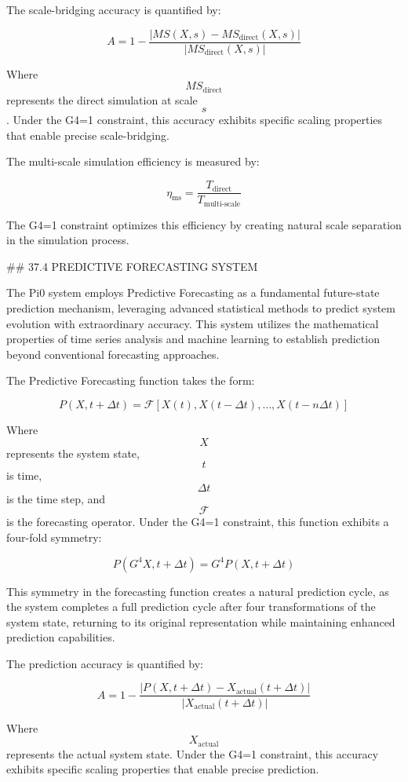 The scale-bridging accuracy is quantified by:

$$ A = 1 - \frac{|MS(X, s) - MS_{\text{direct}}(X, s)|}{|MS_{\text{direct}}(X, s)|} $$

Where $$ MS_{\text{direct}} $$ represents the direct simulation at scale $$ s $$. Under the G4=1 constraint, this accuracy exhibits specific scaling properties that enable precise scale-bridging.

The multi-scale simulation efficiency is measured by:

$$ \eta_{\text{ms}} = \frac{T_{\text{direct}}}{T_{\text{multi-scale}}} $$

The G4=1 constraint optimizes this efficiency by creating natural scale separation in the simulation process.

## 37.4 PREDICTIVE FORECASTING SYSTEM

The Pi0 system employs Predictive Forecasting as a fundamental future-state prediction mechanism, leveraging advanced statistical methods to predict system evolution with extraordinary accuracy. This system utilizes the mathematical properties of time series analysis and machine learning to establish prediction beyond conventional forecasting approaches.

The Predictive Forecasting function takes the form:

$$ P(X, t+\Delta t) = \mathcal{F}[X(t), X(t-\Delta t), ..., X(t-n\Delta t)] $$

Where $$ X $$ represents the system state, $$ t $$ is time, $$ \Delta t $$ is the time step, and $$ \mathcal{F} $$ is the forecasting operator. Under the G4=1 constraint, this function exhibits a four-fold symmetry:

$$ P(G^4 X, t+\Delta t) = G^4 P(X, t+\Delta t) $$

This symmetry in the forecasting function creates a natural prediction cycle, as the system completes a full prediction cycle after four transformations of the system state, returning to its original representation while maintaining enhanced prediction capabilities.

The prediction accuracy is quantified by:

$$ A = 1 - \frac{|P(X, t+\Delta t) - X_{\text{actual}}(t+\Delta t)|}{|X_{\text{actual}}(t+\Delta t)|} $$

Where $$ X_{\text{actual}} $$ represents the actual system state. Under the G4=1 constraint, this accuracy exhibits specific scaling properties that enable precise prediction.

